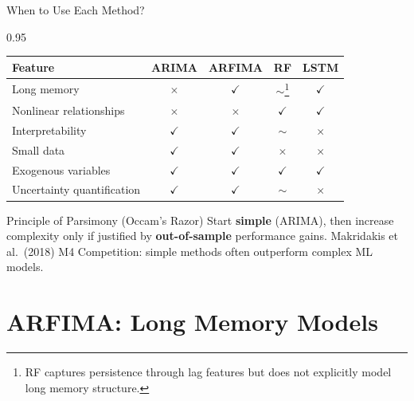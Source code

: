 \documentclass[9pt, aspectratio=169, t]{beamer}
\begin{document}
\begin{frame}{When to Use Each Method?}
    \begin{cminipage}{0.95\textwidth}
    \vspace{-0.2cm}
    \begin{center}
    {\small
    \begin{tabular}{l|c|c|c|c}
        \toprule
        \textbf{Feature} & \textbf{ARIMA} & \textbf{ARFIMA} & \textbf{RF} & \textbf{LSTM} \\
        \midrule
        Long memory & $\times$ & $\checkmark$ & $\sim$\footnote{\scriptsize RF captures persistence through lag features but does not explicitly model long memory structure.} & $\checkmark$ \\
        Nonlinear relationships & $\times$ & $\times$ & $\checkmark$ & $\checkmark$ \\
        Interpretability & $\checkmark$ & $\checkmark$ & $\sim$ & $\times$ \\
        Small data & $\checkmark$ & $\checkmark$ & $\times$ & $\times$ \\
        Exogenous variables & $\checkmark$ & $\checkmark$ & $\checkmark$ & $\checkmark$ \\
        Uncertainty quantification & $\checkmark$ & $\checkmark$ & $\sim$ & $\times$ \\
        \bottomrule
    \end{tabular}
    }
    \end{center}

    \vspace{0.1cm}

    \begin{exampleblock}{Principle of Parsimony (Occam's Razor)}
        Start \textbf{simple} (ARIMA), then increase complexity only if justified by \textbf{out-of-sample} performance gains.
        {\footnotesize Makridakis et al.\ (2018) M4 Competition: simple methods often outperform complex ML models.}
    \end{exampleblock}
    \end{cminipage}
\end{frame}

\section{ARFIMA: Long Memory Models}
\end{document}
